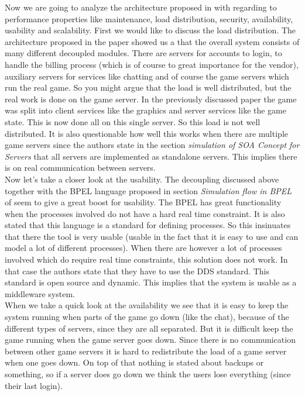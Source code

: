 \noindent Now we are going to analyze the architecture proposed in \cite{service} with regarding to performance properties like maintenance, load distribution, security, availability, usability and scalability. 
First we would like to discuss the load distribution. 
The architecture proposed in the paper showed us a that the overall system consists of many different decoupled modules. 
There are servers for accounts to login, to handle the billing process (which is of course to great importance for the vendor), auxiliary servers for services like chatting and of course the game servers which run the real game. 
So you might argue that the load is well distributed, but the real work is done on the game server. 
In the previously discussed paper the game was split into client services like the graphics and server services like the game state. 
This is now done all on this single server. 
So this load is not well distributed. 
It is also questionable how well this works when there are multiple game servers since the authors state in the section \emph{simulation of SOA Concept for Servers} that all servers are implemented as standalone servers. 
This implies there is on real communication between servers. \\
\indent Now let’s take a closer look at the usability. 
The decoupling discussed above together with the BPEL language proposed in section \emph{Simulation flow in BPEL} of \cite{service} seem to give a great boost for usability. 
The BPEL has great functionality when the processes involved do not have a hard real time constraint. 
It is also stated that this language is a standard for defining processes. 
So this insinuates that there the tool is very usable (usable in the fact that it is easy to use and can model a lot of different processes). 
When there are however a lot of processes involved which do require real time constraints, this solution does not work. 
In that case the authors state that they have to use the DDS standard. 
This standard is open source and dynamic. 
This implies that the system is usable as a middleware system.\\
\indent When we take a quick look at the availability we see that it is easy to keep the system running when parts of the game go down (like the chat), because of the different types of servers, since they are all separated. 
But it is difficult keep the game running when the game server goes down. 
Since there is no communication between other game servers it is hard to redistribute the load of a game server when one goes down. 
On top of that nothing is stated about backups or something, so if a server does go down we think the users lose everything (since their last login). \\
